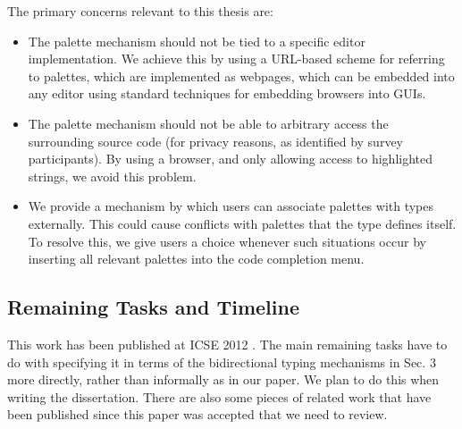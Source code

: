 The primary concerns relevant to this thesis are:
\begin{itemize}
\item The palette mechanism should not be tied to a specific editor implementation. We achieve this by using a URL-based scheme for referring to palettes, which are implemented as webpages, which can be embedded into any editor using standard techniques for embedding browsers into GUIs.
\item The palette mechanism should not be able to arbitrary access the surrounding source code (for privacy reasons, as identified by survey participants). By using a browser, and only allowing access to highlighted strings, we avoid this problem.
\item We provide a mechanism by which users can associate palettes with types externally. This could cause conflicts with palettes that the type defines itself. To resolve this, we give users a choice whenever such situations occur by inserting all relevant palettes into the code completion menu.
\end{itemize}

\subsection{Remaining Tasks and Timeline}
This work has been published at ICSE 2012 \cite{Omar:2012:ACC:2337223.2337324}. The main remaining tasks have to do with specifying it in terms of the bidirectional typing mechanisms in Sec. 3 more directly, rather than informally as in our paper. We plan to do this when writing the dissertation. There are also some pieces of related work that have been published since this paper was accepted that we need to review. 
